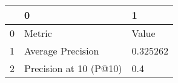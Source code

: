 \begin{tabular}{lll}
\toprule
{} &                       0 &         1 \\
\midrule
0 &                  Metric &     Value \\
1 &       Average Precision &  0.325262 \\
2 &  Precision at 10 (P@10) &       0.4 \\
\bottomrule
\end{tabular}
